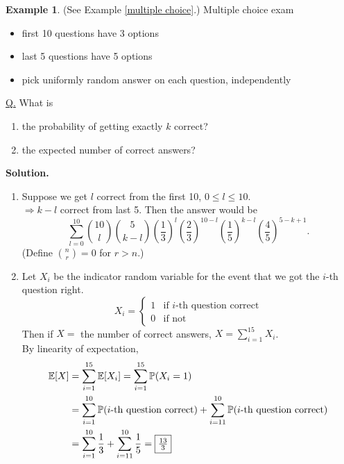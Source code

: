 \documentclass[a4paper,11pt]{amsbook}
\theoremstyle{definition}
\newtheorem{example}{\hspace{-2em} \color{darkblue} Example}[chapter]
\theoremstyle{remark}
\newcommand{\E}{\mathbb{E}}
\renewcommand{\P}{\mathbb{P}}
\newcommand\0{\varnothing}
\begin{document}
    \begin{example} (See Example \ref{multiple choice}.)
        Multiple choice exam
        \begin{itemize}
            \item first 10 questions have 3 options
            \item last 5 questions have 5 options
            \item pick uniformly random answer on each question, independently
        \end{itemize}
        \underline{Q.} What is \begin{enumerate}
            \item the probability of getting exactly $k$ correct?
            \item the expected number of correct answers?
        \end{enumerate}
        \textbf{Solution.} \begin{enumerate}
            \item Suppose we get $l$ correct from the first 10, $0\leq l\leq10$.\\
            $\Rightarrow k-l$ correct from last 5. Then the answer would be
            $$\sum_{l=0}^{10}\binom{10}l\binom5{k-l}\left( \frac{1}{3} \right)^l\left( \frac{2}{3} \right)^{10-l}\left( \frac{1}{5} \right)^{k-l}\left( \frac{4}{5} \right)^{5-k+1}.$$
            (Define $\binom nr=0$ for $r>n$.)
            \item Let $X_i$ be the indicator random variable for the event that we got the $i$-th question right.
            $$X_i=\begin{cases}
                1 & \text{if $i$-th question correct} \\
                0 & \text{if not}
            \end{cases}$$
            Then if $X=$ the number of correct answers, $X=\sum_{i=1}^{15}X_i$.\\
            By linearity of expectation, \begin{align*}
                \E[X]&=\sum_{i=1}^{15}\E[X_i]=\sum_{i=1}^{15}\P(X_i=1) \\
                &=\sum_{i=1}^{10}\P(i\text{-th question correct})+\sum_{i=11}^{10}\P(i\text{-th question correct}) \\
                &=\sum_{i=1}^{10}\frac13+\sum_{i=11}^{10}\frac15=\fbox{$\frac{13}{3}$}
            \end{align*}
        \end{enumerate}
    \end{example}
\end{document}

